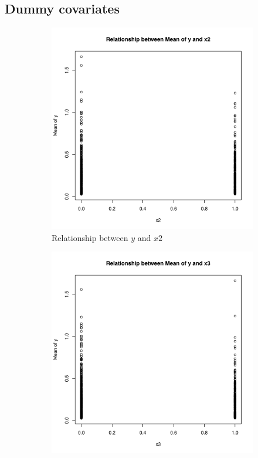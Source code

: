 \documentclass[12pt,a4paper,twoside]{article}
\begin{document}
\subsection{Dummy covariates}
\label{ssec:dummycoviariates}
\begin{figure}[!ht]
    \begin{subfigure}{.45\textwidth}
        \centering
        \includegraphics[width=\linewidth]{img/relationship_os_x2.pdf}
        \caption{Relationship between $y$ and $x2$}
        \label{fig:y_x2_rel}
    \end{subfigure}
    \begin{subfigure}{.45\textwidth}
        \centering
        \includegraphics[width=\linewidth]{img/relationship_os_x3.pdf}

\end{subfigure}
\end{figure}
\end{document}
